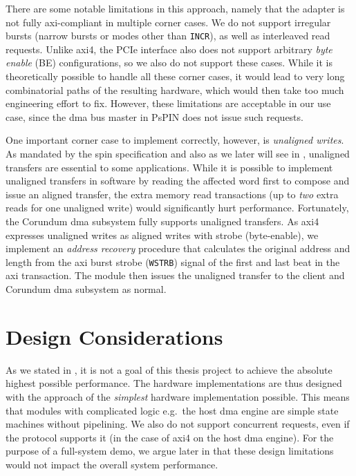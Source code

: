 There are some notable limitations in this approach, namely that the adapter is not fully \ac{axi}-compliant in multiple corner cases.  We do not support irregular bursts (narrow bursts or modes other than \texttt{INCR}), as well as interleaved read requests.  Unlike \ac{axi}4, the PCIe interface also does not support arbitrary \emph{byte enable} (BE) configurations, so we also do not support these cases.  While it is theoretically possible to handle all these corner cases, it would lead to very long combinatorial paths of the resulting hardware, which would then take too much engineering effort to fix.  However, these limitations are acceptable in our use case, since the \ac{dma} bus master in PsPIN does not issue such requests.

One important corner case to implement correctly, however, is \emph{unaligned writes}.  As mandated by the \ac{spin} specification and also as we later will see in , unaligned transfers are essential to some applications.  While it is possible to implement unaligned transfers in software by reading the affected word first to compose and issue an aligned transfer, the extra memory read transactions (up to \emph{two} extra reads for one unaligned write) would significantly hurt performance.  Fortunately, the Corundum \ac{dma} subsystem fully supports unaligned transfers.  As \ac{axi}4 expresses unaligned writes as aligned writes with strobe (byte-enable), we implement an \emph{address recovery} procedure that calculates the original address and length from the \ac{axi} burst strobe (\texttt{WSTRB}) signal of the first and last beat in the \ac{axi} transaction.  The module then issues the unaligned transfer to the client and Corundum \ac{dma} subsystem as normal.

\section{Design Considerations} \label{sec:hw-design-considerations}

As we stated in , it is not a goal of this thesis project to achieve the absolute highest possible performance.  The hardware implementations are thus designed with the approach of the \emph{simplest} hardware implementation possible.  This means that modules with complicated logic e.g.\ the host \ac{dma} engine are simple state machines without pipelining.  We also do not support concurrent requests, even if the protocol supports it (in the case of \ac{axi}4 on the host \ac{dma} engine).  For the purpose of a full-system demo, we argue later in  that these design limitations would not impact the overall system performance.

